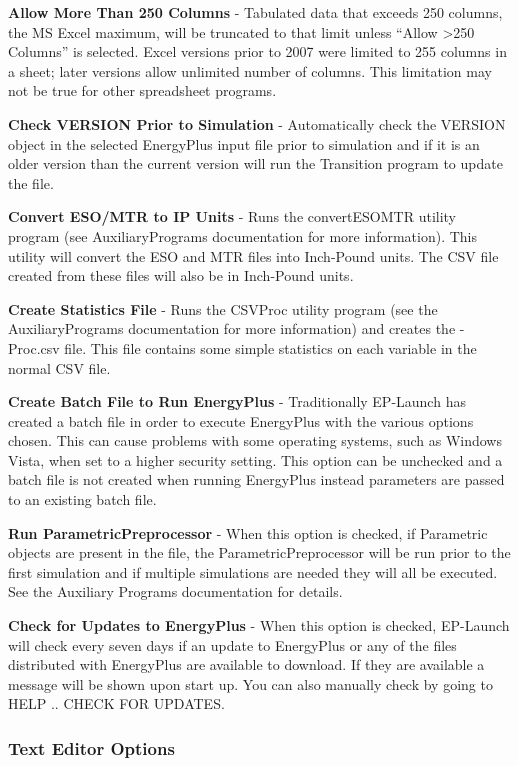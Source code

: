 \textbf{Allow More Than 250 Columns} - Tabulated data that exceeds 250 columns, the MS Excel maximum, will be truncated to that limit unless ``Allow \textgreater{}250 Columns'' is selected. Excel versions prior to 2007 were limited to 255 columns in a sheet; later versions allow unlimited number of columns. This limitation may not be true for other spreadsheet programs.

\textbf{Check VERSION Prior to Simulation} - Automatically check the VERSION object in the selected EnergyPlus input file prior to simulation and if it is an older version than the current version will run the Transition program to update the file.

\textbf{Convert ESO/MTR to IP Units} - Runs the convertESOMTR utility program (see AuxiliaryPrograms documentation for more information). This utility will convert the ESO and MTR files into Inch-Pound units. The CSV file created from these files will also be in Inch-Pound units.

\textbf{Create Statistics File} - Runs the CSVProc utility program (see the AuxiliaryPrograms documentation for more information) and creates the -Proc.csv file. This file contains some simple statistics on each variable in the normal CSV file.

\textbf{Create Batch File to Run EnergyPlus} - Traditionally EP-Launch has created a batch file in order to execute EnergyPlus with the various options chosen. This can cause problems with some operating systems, such as Windows Vista, when set to a higher security setting. This option can be unchecked and a batch file is not created when running EnergyPlus instead parameters are passed to an existing batch file.

\textbf{Run ParametricPreprocessor} - When this option is checked, if Parametric objects are present in the file, the ParametricPreprocessor will be run prior to the first simulation and if multiple simulations are needed they will all be executed. See the Auxiliary Programs documentation for details.

\textbf{Check for Updates to EnergyPlus} - When this option is checked, EP-Launch will check every seven days if an update to EnergyPlus or any of the files distributed with EnergyPlus are available to download. If they are available a message will be shown upon start up. You can also manually check by going to HELP .. CHECK FOR UPDATES.

\subsubsection{Text Editor Options}\label{text-editor-options}

